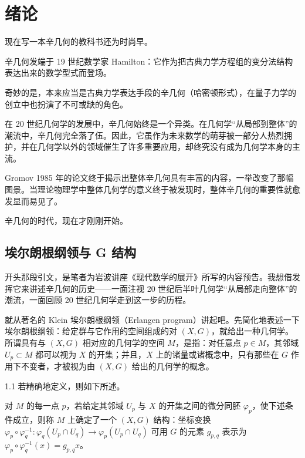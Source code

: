 \chapter{绪论}

现在写一本辛几何的教科书还为时尚早。

辛几何发端于 19 世纪数学家 Hamilton：它作为把古典力学方程组的变分法结构表达出来的数学型式而登场。

奇妙的是，本来应当是古典力学表达手段的辛几何（哈密顿形式），在量子力学的创立中也扮演了不可或缺的角色。

在 20 世纪几何学的发展中，辛几何始终是一个异类。在几何学“从局部到整体”的潮流中，辛几何完全落了伍。因此，它虽作为未来数学的萌芽被一部分人热烈拥护，并在几何学以外的领域催生了许多重要应用，却终究没有成为几何学本身的主流。

Gromov 1985 年的论文终于揭示出整体辛几何具有丰富的内容，一举改变了那幅图景。当理论物理学中整体几何学的意义终于被发现时，整体辛几何的重要性就愈发显而易见了。

辛几何的时代，现在才刚刚开始。

\section{埃尔朗根纲领与 G 结构}

开头那段引文，是笔者为岩波讲座《现代数学的展开》所写的内容预告。我想借发挥它来讲述辛几何的历史——一面注视 20 世纪后半叶几何学“从局部走向整体”的潮流，一面回顾 20 世纪几何学走到这一步的历程。


就从著名的 Klein 埃尔朗根纲领（Erlangen program）讲起吧。先简化地表述一下埃尔朗根纲领：给定群与它作用的空间组成的对 $(X,G)$，就给出一种几何学。所谓具有与 $(X,G)$ 相对应的几何学的空间 $M$，是指：对任意点 $p\in M$，其邻域 $U_p\subset M$ 都可以视为 $X$ 的开集；并且，$X$ 上的诸量或诸概念中，只有那些在 $G$ 作用下不变者，才被视为由 $(X,G)$ 给出的几何学的概念。

\begin{remark}{1.1}
  若精确地定义，则如下所述。

  对 $M$ 的每一点 $p$，若给定其邻域 $U_p$ 与 $X$ 的开集之间的微分同胚 $\varphi_p$，使下述条件成立，则称 $M$ 上确定了一个 $(X,G)$ 结构：坐标变换 $\varphi_p\circ\varphi_q^{-1}\colon\varphi_q(U_p\cap U_q)\to\varphi_p(U_p\cap U_q)$ 可用 $G$ 的元素 $g_{p,q}$ 表示为 $\varphi_p\circ\varphi_q^{-1}(x)=g_{p,q}x$。
\end{remark}

